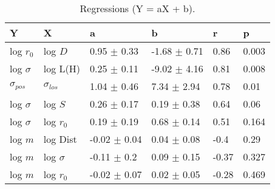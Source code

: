\begin{table}
\centering
\caption{Regressions (Y = aX + b).}
\begin{tabular}{llllll}
\toprule
              Y &               X &                 a &                 b &      r &      p \\
\midrule
      log $r_0$ &         log $D$ &   0.95 $\pm$ 0.33 &  -1.68 $\pm$ 0.71 &   0.86 &  0.003 \\
   log $\sigma$ &        log L(H) &   0.25 $\pm$ 0.11 &  -9.02 $\pm$ 4.16 &   0.81 &  0.008 \\
 $\sigma_{pos}$ &  $\sigma_{los}$ &   1.04 $\pm$ 0.46 &   7.34 $\pm$ 2.94 &   0.78 &   0.01 \\
   log $\sigma$ &         log $S$ &   0.26 $\pm$ 0.17 &   0.19 $\pm$ 0.38 &   0.64 &   0.06 \\
   log $\sigma$ &     log $r_{0}$ &   0.19 $\pm$ 0.19 &   0.68 $\pm$ 0.14 &   0.51 &  0.164 \\
        log $m$ &        log Dist &  -0.02 $\pm$ 0.04 &   0.04 $\pm$ 0.08 &   -0.4 &   0.29 \\
        log $m$ &    log $\sigma$ &   -0.11 $\pm$ 0.2 &   0.09 $\pm$ 0.15 &  -0.37 &  0.327 \\
        log $m$ &     log $r_{0}$ &  -0.02 $\pm$ 0.07 &   0.02 $\pm$ 0.05 &  -0.28 &  0.469 \\
\bottomrule
\end{tabular}
\end{table}
